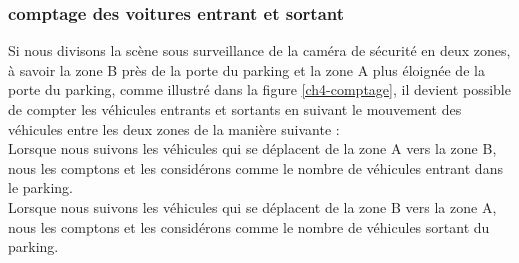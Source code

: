     
    
    
    
    
    

\subsubsection{comptage des voitures entrant et sortant}
Si nous divisons la scène sous surveillance de la caméra de sécurité en deux zones,  à savoir la zone B près de la porte du parking et la zone A plus éloignée de la porte du parking, comme illustré dans la figure \ref{ch4-comptage}, il devient possible de compter les véhicules entrants et sortants en suivant le mouvement des véhicules entre les deux zones de la manière suivante :\\
Lorsque nous suivons les véhicules qui se déplacent de la zone A vers la zone B, nous les comptons et les considérons comme le nombre de véhicules entrant dans le parking.\\
Lorsque nous suivons les véhicules qui se déplacent de la zone B vers la zone A, nous les comptons et les considérons comme le nombre de véhicules sortant du parking.

